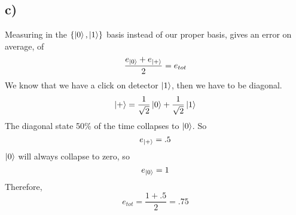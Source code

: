 \documentclass[]{article}
\begin{document}
\hypertarget{c-3}{%
\subsection{c)}\label{c-3}}

Measuring in the \(\left\{ \ket{0},\ket{1} \right\}\) basis instead of
our proper basis, gives an error on average, of \[
\frac{{e_{\ket{0}}+e_{\ket{+} }}}{2}=e_{tot}
\] We know that we have a click on detector \(\ket{1}\), then we have to
be diagonal. \[
\ket{+}  = \frac{1}{\sqrt{ 2 } }\ket{0} +\frac{1}{\sqrt{ 2 }}\ket{1} 
\] The diagonal state 50\% of the time collapses to \(\ket{0}\). So \[
e_{\ket{+} } = .5
\] \(\ket{0}\) will always collapse to zero, so \[
e_{\ket{0} } = 1
\] Therefore, \[
e_{tot} = \frac{{1+.5}}{2} = .75
\]
\end{document}
